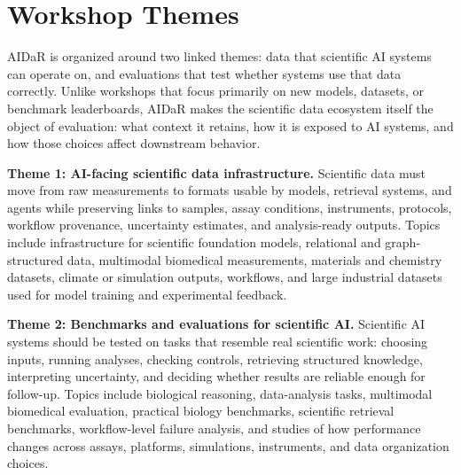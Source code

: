 \documentclass[10pt]{article}
\begin{document}



\section{Workshop Themes}

AIDaR is organized around two linked themes: data that scientific AI systems can operate on, and evaluations that test whether systems use that data correctly. Unlike workshops that focus primarily on new models, datasets, or benchmark leaderboards, AIDaR makes the scientific data ecosystem itself the object of evaluation: what context it retains, how it is exposed to AI systems, and how those choices affect downstream behavior.

\textbf{Theme 1: AI-facing scientific data infrastructure.} Scientific data must move from raw measurements to formats usable by models, retrieval systems, and agents while preserving links to samples, assay conditions, instruments, protocols, workflow provenance, uncertainty estimates, and analysis-ready outputs. Topics include infrastructure for scientific foundation models, relational and graph-structured data, multimodal biomedical measurements, materials and chemistry datasets, climate or simulation outputs, workflows, and large industrial datasets used for model training and experimental feedback.

\textbf{Theme 2: Benchmarks and evaluations for scientific AI.} Scientific AI systems should be tested on tasks that resemble real scientific work: choosing inputs, running analyses, checking controls, retrieving structured knowledge, interpreting uncertainty, and deciding whether results are reliable enough for follow-up. Topics include biological reasoning, data-analysis tasks, multimodal biomedical evaluation, practical biology benchmarks, scientific retrieval benchmarks, workflow-level failure analysis, and studies of how performance changes across assays, platforms, simulations, instruments, and data organization choices.
\end{document}
